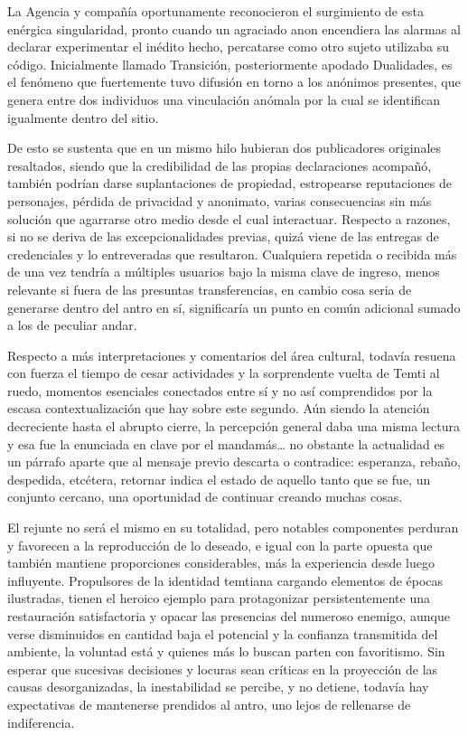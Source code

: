 \documentclass[
]{book}
\begin{document}
La Agencia y compañía oportunamente reconocieron el surgimiento de esta enérgica singularidad, pronto cuando un agraciado anon encendiera las alarmas al declarar experimentar el inédito hecho, percatarse como otro sujeto utilizaba su código. Inicialmente llamado Transición, posteriormente apodado Dualidades, es el fenómeno que fuertemente tuvo difusión en torno a los anónimos presentes, que genera entre dos individuos una vinculación anómala por la cual se identifican igualmente dentro del sitio.

De esto se sustenta que en un mismo hilo hubieran dos publicadores originales resaltados, siendo que la credibilidad de las propias declaraciones acompañó, también podrían darse suplantaciones de propiedad, estropearse reputaciones de personajes, pérdida de privacidad y anonimato, varias consecuencias sin más solución que agarrarse otro medio desde el cual interactuar. Respecto a razones, si no se deriva de las excepcionalidades previas, quizá viene de las entregas de credenciales y lo entreveradas que resultaron. Cualquiera repetida o recibida más de una vez tendría a múltiples usuarios bajo la misma clave de ingreso, menos relevante si fuera de las presuntas transferencias, en cambio cosa seria de generarse dentro del antro en sí, significaría un punto en común adicional sumado a los de peculiar andar.

Respecto a más interpretaciones y comentarios del área cultural, todavía resuena con fuerza el tiempo de cesar actividades y la sorprendente vuelta de Temti al ruedo, momentos esenciales conectados entre sí y no así comprendidos por la escasa contextualización que hay sobre este segundo. Aún siendo la atención decreciente hasta el abrupto cierre, la percepción general daba una misma lectura y esa fue la enunciada en clave por el mandamás\ldots{} no obstante la actualidad es un párrafo aparte que al mensaje previo descarta o contradice: esperanza, rebaño, despedida, etcétera, retornar indica el estado de aquello tanto que se fue, un conjunto cercano, una oportunidad de continuar creando muchas cosas.

El rejunte no será el mismo en su totalidad, pero notables componentes perduran y favorecen a la reproducción de lo deseado, e igual con la parte opuesta que también mantiene proporciones considerables, más la experiencia desde luego influyente. Propulsores de la identidad temtiana cargando elementos de épocas ilustradas, tienen el heroico ejemplo para protagonizar persistentemente una restauración satisfactoria y opacar las presencias del numeroso enemigo, aunque verse disminuidos en cantidad baja el potencial y la confianza transmitida del ambiente, la voluntad está y quienes más lo buscan parten con favoritismo. Sin esperar que sucesivas decisiones y locuras sean críticas en la proyección de las causas desorganizadas, la inestabilidad se percibe, y no detiene, todavía hay expectativas de mantenerse prendidos al antro, uno lejos de rellenarse de indiferencia.
\end{document}
